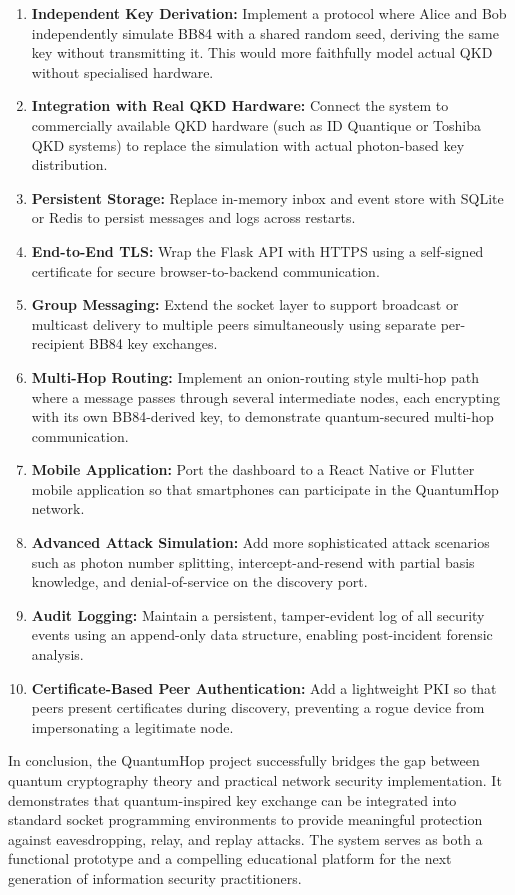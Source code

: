 \begin{enumerate}
    \item \textbf{Independent Key Derivation:} Implement a protocol where Alice and Bob independently simulate BB84 with a shared random seed, deriving the same key without transmitting it. This would more faithfully model actual QKD without specialised hardware.

    \item \textbf{Integration with Real QKD Hardware:} Connect the system to commercially available QKD hardware (such as ID Quantique or Toshiba QKD systems) to replace the simulation with actual photon-based key distribution.

    \item \textbf{Persistent Storage:} Replace in-memory inbox and event store with SQLite or Redis to persist messages and logs across restarts.

    \item \textbf{End-to-End TLS:} Wrap the Flask API with HTTPS using a self-signed certificate for secure browser-to-backend communication.

    \item \textbf{Group Messaging:} Extend the socket layer to support broadcast or multicast delivery to multiple peers simultaneously using separate per-recipient BB84 key exchanges.

    \item \textbf{Multi-Hop Routing:} Implement an onion-routing style multi-hop path where a message passes through several intermediate nodes, each encrypting with its own BB84-derived key, to demonstrate quantum-secured multi-hop communication.

    \item \textbf{Mobile Application:} Port the dashboard to a React Native or Flutter mobile application so that smartphones can participate in the QuantumHop network.

    \item \textbf{Advanced Attack Simulation:} Add more sophisticated attack scenarios such as photon number splitting, intercept-and-resend with partial basis knowledge, and denial-of-service on the discovery port.

    \item \textbf{Audit Logging:} Maintain a persistent, tamper-evident log of all security events using an append-only data structure, enabling post-incident forensic analysis.

    \item \textbf{Certificate-Based Peer Authentication:} Add a lightweight PKI so that peers present certificates during discovery, preventing a rogue device from impersonating a legitimate node.
\end{enumerate}

In conclusion, the QuantumHop project successfully bridges the gap between quantum cryptography theory and practical network security implementation. It demonstrates that quantum-inspired key exchange can be integrated into standard socket programming environments to provide meaningful protection against eavesdropping, relay, and replay attacks. The system serves as both a functional prototype and a compelling educational platform for the next generation of information security practitioners.
